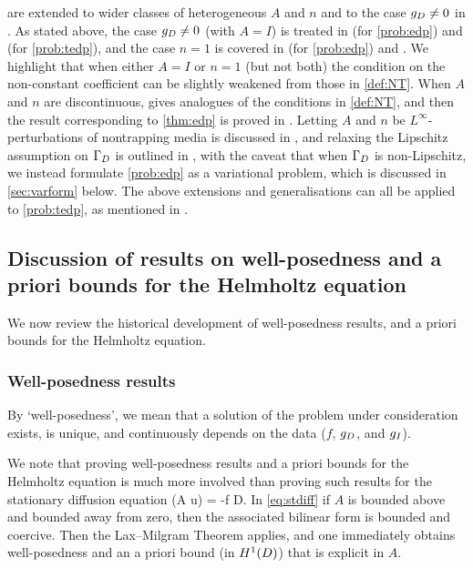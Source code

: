 \label{rem:heteroextensions}
 are extended to wider classes of heterogeneous $A$ and $n$ and to the case $g_{D} \neq 0$ in \cite{GrPeSp:19}. As stated above, the case $g_{D} \neq 0$ (with $A=I$) is treated in \cite[Theorem 2.19(ii)]{GrPeSp:19} (for \cref{prob:edp}) and \cite[Theorem A.6(iv)]{GrPeSp:19} (for \cref{prob:tedp}), and the case $n=1$ is covered in \cite[Theorem 2.19(i)]{GrPeSp:19} (for \cref{prob:edp}) and \cite[Theorem A.6(ii)]{GrPeSp:19}. We highlight that when either $A=I$ or $n=1$ (but not both) the condition on the non-constant coefficient can be slightly weakened from those in \cref{def:NT}. When $A$ and $n$ are discontinuous, \cite[Condition 2.6]{GrPeSp:19} gives analogues of the conditions in \cref{def:NT}, and then the result corresponding to \cref{thm:edp} is proved in \cite[Theorem 2.7]{GrPeSp:19}. Letting $A$ and $n$ be $L^\infty$-perturbations of nontrapping media is discussed in \cite[Remark 2.15]{GrPeSp:19}, and relaxing the Lipschitz assumption on $\Gamma_{D}$ is outlined in \cite[Remark 2.13]{GrPeSp:19}, with the caveat that when $\Gamma_{D}$ is non-Lipschitz, we instead formulate \cref{prob:edp} as a variational problem, which is discussed in \cref{sec:varform} below. The above extensions and generalisations can all be applied to \cref{prob:tedp}, as mentioned in \cite[p. 2916]{GrPeSp:19}.
\ere
\subsection{Discussion of results on well-posedness and a priori bounds for the Helmholtz equation}\label{sec:wpdisc}

We  now review the historical development of well-posedness results, and a priori bounds for the Helmholtz equation.

\subsubsection{Well-posedness results}
By `well-posedness', we mean that a solution of the problem under consideration exists, is unique, and continuously depends on the data ($f$, $g_{D}$, and $g_{I}$).

We note that proving well-posedness results and a priori bounds for the Helmholtz equation is much more involved than proving such results for the stationary diffusion equation
\beq\label{eq:stdiff}
\grad \cdot \mleft(A \grad u\mright) = -f \tin D.
\eeq
In \eqref{eq:stdiff} if $A$ is bounded above and bounded away from zero, then the associated bilinear form is bounded and coercive. Then the Lax--Milgram Theorem applies, and one immediately obtains well-posedness and an a priori bound (in $\HoD$) that is explicit in $A$.

